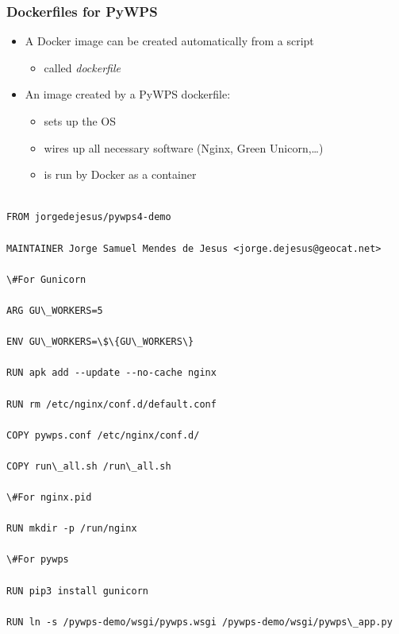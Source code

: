 \documentclass{beamer}
\begin{document}
\begin{frame}
\frametitle<presentation>{Dockerfiles for PyWPS}

\begin{itemize}
  \item A Docker image can be created automatically from a script
   \begin{itemize} \item called \textit{dockerfile} \end{itemize}
  \item An image created by a PyWPS dockerfile: 
  \begin{itemize} 
    \item sets up the OS 
    \item wires up all necessary software (Nginx, Green Unicorn,\ldots)
    \item is run by Docker as a container   
  \end{itemize}
\end{itemize}

\tiny{
\begin{verbatim}

FROM jorgedejesus/pywps4-demo

MAINTAINER Jorge Samuel Mendes de Jesus <jorge.dejesus@geocat.net>

\#For Gunicorn

ARG GU\_WORKERS=5

ENV GU\_WORKERS=\$\{GU\_WORKERS\}

RUN apk add --update --no-cache nginx

RUN rm /etc/nginx/conf.d/default.conf

COPY pywps.conf /etc/nginx/conf.d/

COPY run\_all.sh /run\_all.sh

\#For nginx.pid    

RUN mkdir -p /run/nginx

\#For pywps

RUN pip3 install gunicorn

RUN ln -s /pywps-demo/wsgi/pywps.wsgi /pywps-demo/wsgi/pywps\_app.py
\end{verbatim}
}


\end{frame}
\end{document}

